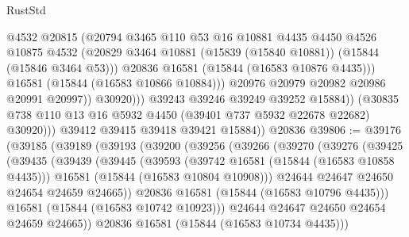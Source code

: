 \begin{lexlean}{RustStd}
\begin{coremodule}
                            @4532
                            @20815
                            (@20794
                              @3465
                              @110
                              @53
                              @16
                              @10881
                              @4435
                              @4450
                              @4526
                              @10875
                              @4532
                              (@20829
                                @3464
                                @10881
                                (@15839 (@15840 @10881))
                                (@15844 (@15846 @3464 @53)))
                              @20836
                              @16581
                              (@15844 (@16583 @10876 @4435)))
                            @16581
                            (@15844 (@16583 @10866 @10884)))
                          @20976
                          @20979
                          @20982
                          @20986
                          @20991
                          @20997))
                      @30920)))
                @39243
                @39246
                @39249
                @39252
                @15884))
            (@30835 @738 @110 @13 @16 @5932 @4450 (@39401 @737 @5932 @22678 @22682) @30920)))
        @39412
        @39415
        @39418
        @39421
        @15884))
    @20836
@39806 := @39176
    (@39185
      (@39189
        (@39193
          (@39200
            (@39256
              (@39266
                (@39270
                  (@39276
                    (@39425
                      (@39435
                        (@39439
                          (@39445
                            (@39593
                              (@39742 @16581 (@15844 (@16583 @10858 @4435)))
                              @16581
                              (@15844 (@16583 @10804 @10908)))
                            @24644
                            @24647
                            @24650
                            @24654
                            @24659
                            @24665))
                        @20836
                        @16581
                        (@15844 (@16583 @10796 @4435)))
                      @16581
                      (@15844 (@16583 @10742 @10923)))
                    @24644
                    @24647
                    @24650
                    @24654
                    @24659
                    @24665))
                @20836
                @16581
                (@15844 (@16583 @10734 @4435)))

\end{coremodule}
\end{lexlean}
